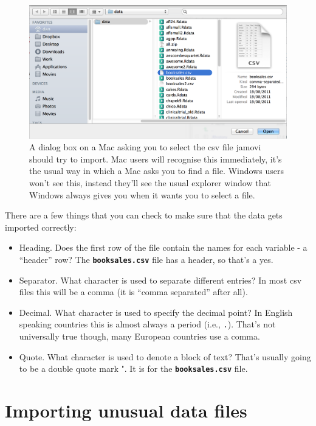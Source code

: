 \documentclass[
]{book}
\providecommand{\tightlist}{%
  \setlength{\itemsep}{0pt}\setlength{\parskip}{0pt}}
\begin{document}
\begin{figure}

{\centering \includegraphics[width=1\linewidth]{img/mechanics/openscreen} 

}

\caption{A dialog box on a Mac asking you to select the csv file jamovi should try to import. Mac users will recognise this immediately, it’s the usual way in which a Mac asks you to find a file. Windows users won’t see this, instead they’ll see the usual explorer window that Windows always gives you when it wants you to select a file.}\label{fig:fileopen}
\end{figure}

There are a few things that you can check to make sure that the data gets imported correctly:

\begin{itemize}
\tightlist
\item
  Heading. Does the first row of the file contain the names for each variable - a ``header'' row? The \textbf{\texttt{booksales.csv}} file has a header, so that's a yes.
\item
  Separator. What character is used to separate different entries? In most csv files this will be a comma (it is ``comma separated'' after all).
\item
  Decimal. What character is used to specify the decimal point? In English speaking countries this is almost always a period (i.e., \texttt{.}). That's not universally true though, many European countries use a comma.
\item
  Quote. What character is used to denote a block of text? That's usually going to be a double quote mark ". It is for the \textbf{\texttt{booksales.csv}} file.
\end{itemize}

\hypertarget{importing}{%
\section{Importing unusual data files}\label{importing}}
\end{document}
